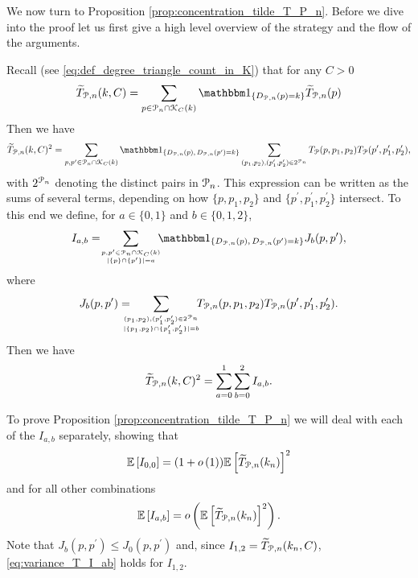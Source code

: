We now turn to Proposition \ref{prop:concentration_tilde_T_P_n}. Before we dive into the proof let us first give a high level overview of the strategy and the flow of the arguments. 

Recall (see \eqref{eq:def_degree_triangle_count_in_K}) that for any $C > 0$
\[
	\widetilde{T}_{\Pcal,n}(k,C) = \sum_{p \in \Pcal_n \cap \Kcal_{C}(k)} \ind{D_{\Pcal,n}(p) = k}
	\widetilde{T}_{\Pcal,n}(p)
\]
Then we have
\[
	\widetilde{T}_{\Pcal,n}(k,C)^2 = \sum_{p, p^\prime \in \Pcal_n \cap \Kcal_C(k)}
		\ind{D_{\Pcal,n}(p), \, D_{\Pcal,n}(p^\prime) = k} 
		\sum_{(p_1, p_2), (p_1^\prime, p_2^\prime) \in 2^{\Pcal_n}}
		T_{\Pcal}(p,p_1,p_2) T_{\Pcal}(p^\prime, p_1^\prime, p_2^\prime),
\]
with $2^{{\mathcal P}_n}$ denoting the distinct pairs in ${\mathcal P}_n$.
This expression can be written as the sums of several terms, depending on how $\{p, p_1, p_2\}$ and $\{p^\prime, p_1^\prime, p_2^\prime\}$ intersect. To this end we define, for $a \in \{0,1\}$ and $b \in \{0,1,2\}$,
\[
	I_{a,b} = \hspace{-3pt} \sum_{p, p^\prime \in \Pcal_n \cap \Kcal_C(k) \atop |\{p\} \cap \{p^\prime\}| = a}
	\hspace{-5pt} \ind{D_{\Pcal,n}(p), \, D_{\Pcal,n}(p^\prime) = k} J_b(p,p^\prime),
\]
where
\[
	J_b(p,p^\prime) = \hspace{-10pt} \sum_{(p_1, p_2), (p_1^\prime, p_2^\prime) \in 2^{\Pcal_n} 
		\atop |\{p_1, p_2\} \cap \{p_1^\prime, p_2^\prime\}| = b}
		\hspace{-5pt} T_{\Pcal,n}(p,p_1,p_2) T_{\Pcal,n}(p^\prime, p_1^\prime, p_2^\prime).
\]
Then we have
\[
	\widetilde{T}_{{\mathcal P},n}(k, C)^2 = \sum_{a = 0}^1 \sum_{b = 0}^2 I_{a,b}.
\]

To prove Proposition \ref{prop:concentration_tilde_T_P_n} we will deal with each of the $I_{a,b}$ separately, showing that 
\begin{equation}\label{eq:variance_T_I_00}
	\mathbb{E}\left[I_{0,0}\right] = (1+o\left(1\right))\mathbb{E}\left[\widetilde{T}_{{\mathcal P},n}(k_n)\right]^2
\end{equation}
and for all other combinations
\begin{equation}\label{eq:variance_T_I_ab}
	\mathbb{E}\left[I_{a,b}\right] = o\left(\mathbb{E}\left[\widetilde{T}_{{\mathcal P},n}(k_n)\right]^2\right).
\end{equation}
Note that $J_{b}(p,p^\prime) \le J_{0}(p,p^\prime)$ and, since $I_{1,2} = \widetilde{T}_{{\mathcal P},n}(k_n,C)$, \eqref{eq:variance_T_I_ab} holds for $I_{1,2}$. 



